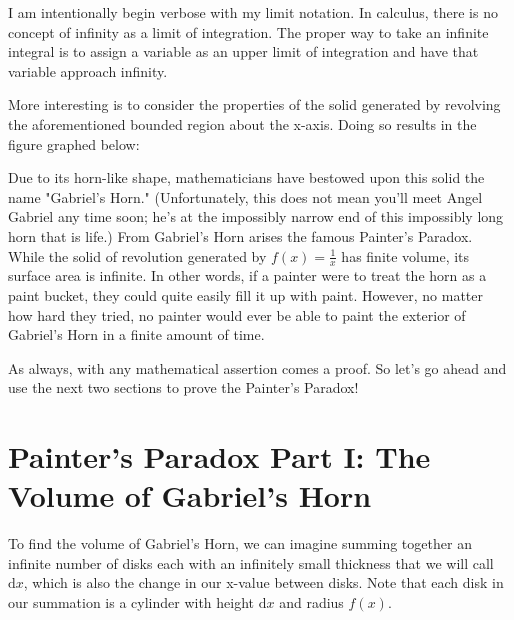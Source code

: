 \documentclass{article}[11pt]
\begin{document}
I am intentionally begin verbose with my limit notation. In calculus, there is no concept of infinity as a limit of integration. The proper way to take an infinite integral is to assign a variable as an upper limit of integration and have that variable approach infinity.

More interesting is to consider the properties of the solid generated by revolving the aforementioned bounded region about the x-axis. Doing so results in the figure graphed below:
\hspace{11pt}

\begin{center}
\end{center}

Due to its horn-like shape, mathematicians have bestowed upon this solid the name "Gabriel's Horn." (Unfortunately, this does not mean you'll meet Angel Gabriel any time soon; he's at the impossibly narrow end of this impossibly long horn that is life.) From Gabriel's Horn arises the famous Painter's Paradox. While the solid of revolution generated by $f(x) = \frac1x$ has finite volume, its surface area is infinite. In other words, if a painter were to treat the horn as a paint bucket, they could quite easily fill it up with paint. However, no matter how hard they tried, no painter would ever be able to paint the exterior of Gabriel's Horn in a finite amount of time.

As always, with any mathematical assertion comes a proof. So let's go ahead and use the next two sections to prove the Painter's Paradox!

\section{Painter's Paradox Part I: The Volume of Gabriel's Horn}
To find the volume of Gabriel's Horn, we can imagine summing together an infinite number of disks each with an infinitely small thickness that we will call $\textrm{d}x$, which is also the change in our x-value between disks. Note that each disk in our summation is a cylinder with height $\textrm{d}x$ and radius $f(x)$.
\end{document}

